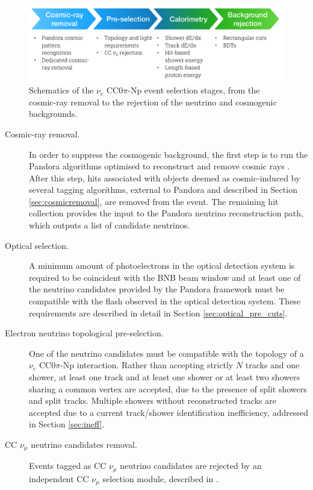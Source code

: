 \begin{figure}[htbp]
\centering
  \includegraphics[width=0.9\linewidth]{figures/selection.png}
  \caption{Schematics of the $\nu_e$ CC0$\pi$-Np event selection stages, from the cosmic-ray removal to the rejection of the neutrino and cosmogenic backgrounds.}
  \label{fig:selection}
\end{figure}

\begin{description}
\item[Cosmic-ray removal.] In order to suppress the cosmogenic background, the first step is to run the Pandora algorithms optimised to reconstruct and remove cosmic rays \cite{Acciarri:2017hat}. After this step, hits associated with objects deemed as cosmic-induced by several tagging algorithms, external to Pandora and described in Section \ref{sec:cosmicremoval}, are removed from the event. The remaining hit collection provides the input to the Pandora neutrino reconstruction path, which outputs a list of candidate neutrinos.

\item[Optical selection.] A minimum amount of photoelectrons in the optical detection system is required to be coincident with the BNB beam window and at least one of the neutrino candidates provided by the Pandora framework must be compatible with the flash observed in the optical detection system. These requirements are described in detail in Section \ref{sec:optical_pre_cuts}.

\item[Electron neutrino topological pre-selection.] One of the neutrino candidates must be compatible with the topology of a $\nu_{e}$ CC0$\pi$-Np interaction. Rather than accepting strictly $N$ tracks and one shower, at least one track and at least one shower or at least two showers sharing a common vertex are accepted, due to the presence of split showers and split tracks. Multiple showers without reconstructed tracks are accepted due to a current track/shower identification inefficiency, addressed in Section \ref{sec:ineff}.

\item[CC $\nu_{\mu}$ neutrino candidates removal.] Events tagged as CC $\nu_{\mu}$ neutrino candidates are rejected by an independent CC $\nu_{\mu}$ selection module, described in \cite{ubxsec}. 


\end{description}
